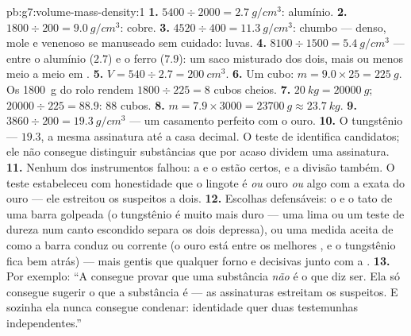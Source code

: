 \begin{solution}{pb:g7:volume-mass-density:1}
\textbf{1.} $5400 \div 2000 = \qty{2.7}{g/cm^3}$: alumínio.
\textbf{2.} $1800 \div 200 = \qty{9.0}{g/cm^3}$: cobre.
\textbf{3.} $4520 \div 400 = \qty{11.3}{g/cm^3}$: chumbo --- denso,
mole e venenoso se manuseado sem cuidado: luvas.
\textbf{4.} $8100 \div 1500 = \qty{5.4}{g/cm^3}$ --- entre o alumínio
($2.7$) e o ferro ($7.9$): um saco misturado dos dois, mais ou menos
meio a meio em .
\textbf{5.} $V = 540 \div 2.7 = \qty{200}{cm^3}$.
\textbf{6.} Um cubo: $m = 9.0 \times 25 = \qty{225}{g}$. Os
\qty{1800}{g} do rolo rendem $1800 \div 225 = 8$ cubos cheios.
\textbf{7.} $\qty{20}{kg} = \qty{20000}{g}$;
$20000 \div 225 = 88.9$: $88$ cubos.
\textbf{8.} $m = 7.9 \times 3000 = \qty{23700}{g} \approx
\qty{23.7}{kg}$.
\textbf{9.} $3860 \div 200 = \qty{19.3}{g/cm^3}$ --- um casamento
perfeito com o ouro.
\textbf{10.} O tungstênio ---  $19.3$, a mesma assinatura
até a casa decimal. O teste de  identifica candidatos; ele
não consegue distinguir substâncias que por acaso dividem uma
assinatura.
\textbf{11.} Nenhum dos instrumentos falhou: a  e o  estão
certos, e a divisão também. O teste estabeleceu com honestidade que o
lingote é \emph{ou} ouro \emph{ou} algo com a  exata do
ouro --- ele estreitou os suspeitos a dois.
\textbf{12.} Escolhas defensáveis: o  e o tato de uma barra
golpeada (o tungstênio é muito mais duro --- uma lima ou um teste de
dureza num canto escondido separa os dois depressa), ou uma medida
aceita de como a barra conduz  ou corrente (o ouro está entre os
melhores , e o tungstênio fica bem atrás) --- mais gentis
que qualquer forno e decisivas junto com a .
\textbf{13.} Por exemplo: ``A  consegue provar que uma
substância \emph{não} é o que diz ser. Ela só consegue sugerir o que
a substância é --- as assinaturas estreitam os suspeitos. E sozinha
ela nunca consegue condenar: identidade quer duas testemunhas
independentes.''
\end{solution}
